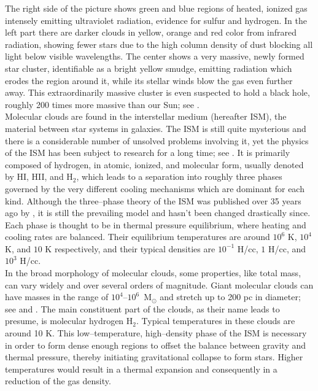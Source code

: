 The right side of the picture shows green and blue regions of heated, ionized gas intensely emitting ultraviolet radiation, evidence for sulfur and hydrogen.
In the left part there are darker clouds in yellow, orange and red color from infrared radiation, showing fewer stars due to the high column density of dust blocking all light below visible wavelengths.
The center shows a very massive, newly formed star cluster, identifiable as a bright yellow smudge, emitting radiation which erodes the region around it, while its stellar winds blow the gas even further away.
This extraordinarily massive cluster is even suspected to hold a black hole, roughly 200 times more massive than our Sun; see \citet{Orion_BH}.
\\[6pt]
%
Molecular clouds are found in the interstellar medium (hereafter ISM), the material between star systems in galaxies.
The ISM is still quite mysterious and there is a considerable number of unsolved problems involving it, yet the physics of the ISM has been subject to research for a long time; see \citet{Draine, Unsolved_Problems}.
It is primarily composed of hydrogen, in atomic, ionized, and molecular form, usually denoted by HI, HII, and H$_{2}$, which leads to a separation into roughly three phases governed by the very different cooling mechanisms which are dominant for each kind.
Although the three--phase theory of the ISM was published over 35 years ago by \citet{ISM_3Phases}, it is still the prevailing model and hasn't been changed drastically since.
Each phase is thought to be in thermal pressure equilibrium, where heating and cooling rates are balanced.
Their equilibrium temperatures are around $10^{6}$ K, $10^{4}$ K, and $10$ K respectively, and their typical densities are $10^{-1}$ H/cc, $1$ H/cc, and $10^{3}$ H/cc.
\\[6pt]
%
In the broad morphology of molecular clouds, some properties, like total mass, can vary widely and over several orders of magnitude.
Giant molecular clouds can have masses in the range of $10^{4}$--$10^{6}$~M$_{\odot}$ and stretch up to 200 pc in diameter; see \citet{GMC_Masses} and \citet{MC_Masses}.
The main constituent part of the clouds, as their name leads to presume, is molecular hydrogen H$_{2}$.
Typical temperatures in these clouds are around 10 K.
This low--temperature, high--density phase of the ISM is necessary in order to form dense enough regions to offset the balance between gravity and thermal pressure, thereby initiating gravitational collapse to form stars.
Higher temperatures would result in a thermal expansion and consequently in a reduction of the gas density.


